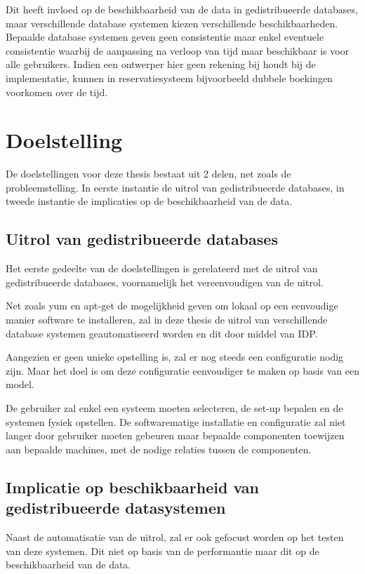 \documentclass{book}
\begin{document}
Dit heeft invloed op de beschikbaarheid van de data in gedistribueerde databases, maar verschillende database systemen kiezen verschillende beschikbaarheden. Bepaalde database systemen geven geen consistentie maar enkel eventuele consistentie waarbij de aanpassing na verloop van tijd maar beschikbaar is voor alle gebruikers. Indien een ontwerper hier geen rekening bij houdt bij de implementatie, kunnen in reservatiesysteem bijvoorbeeld dubbele boekingen voorkomen over de tijd. 

\section{Doelstelling}
De doelstellingen voor deze thesis bestaat uit 2 delen, net zoals de probleemstelling. In eerste instantie de uitrol van gedistribueerde databases, in tweede instantie de implicaties op de beschikbaarheid van de data. 

\subsection{Uitrol van gedistribueerde databases}
Het eerste gedeelte van de doelstellingen is gerelateerd met de uitrol van gedistribueerde databases, voornamelijk het vereenvoudigen van de uitrol. 

Net zoals \gls{yum} en \gls{apt-get} de mogelijkheid geven om lokaal op een eenvoudige manier software te installeren, zal in deze thesis de uitrol van verschillende database systemen geautomatiseerd worden en dit door middel van \gls{IDP}. 

Aangezien er geen unieke opstelling is, zal er nog steeds een configuratie nodig zijn. Maar het doel is om deze configuratie eenvoudiger te maken op basis van een model. 

De gebruiker zal enkel een systeem moeten selecteren, de set-up bepalen en de systemen fysiek opstellen. De softwarematige installatie en configuratie zal niet langer door gebruiker moeten gebeuren maar bepaalde componenten toewijzen aan bepaalde machines, met de nodige relaties tussen de componenten. 

\subsection{Implicatie op beschikbaarheid van gedistribueerde datasystemen} 
Naast de automatisatie van de uitrol, zal er ook gefocust worden op het testen van deze systemen. Dit niet op basis van de performantie maar dit op de beschikbaarheid van de data. 
\end{document}
